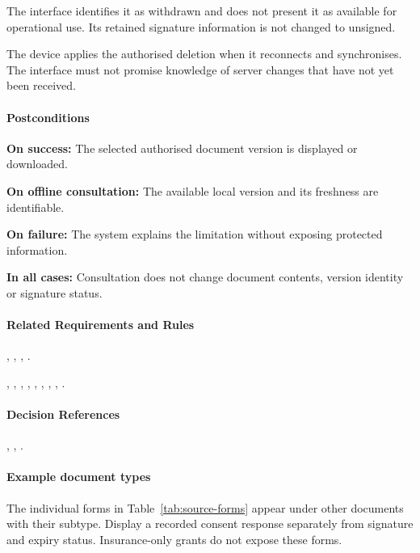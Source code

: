 \begin{description}[style=nextline]
    \item[A10 --- The current source is withdrawn.]
    The interface identifies it as withdrawn
    and does not present it as available
    for operational use.
    Its retained signature information
    is not changed to unsigned.

    \item[A11 --- A deleted version remains on an offline device.]
    The device applies the authorised deletion
    when it reconnects and synchronises.
    The interface must not promise knowledge
    of server changes that have not yet been received.
\end{description}

\paragraph{Postconditions}

\textbf{On success:}
The selected authorised document version
is displayed or downloaded.

\textbf{On offline consultation:}
The available local version and its freshness
are identifiable.

\textbf{On failure:}
The system explains the limitation
without exposing protected information.

\textbf{In all cases:}
Consultation does not change document contents,
version identity or signature status.

\paragraph{Related Requirements and Rules}
\hyperref[fr:038]{}, \hyperref[fr:039]{}, \hyperref[fr:041]{}, \hyperref[fr:044]{}.

\hyperref[br:022]{}, \hyperref[br:023]{}, \hyperref[br:024]{}, \hyperref[br:025]{}, \hyperref[br:026]{}, \hyperref[br:027]{}, \hyperref[br:028]{}, \hyperref[br:029]{}, \hyperref[br:030]{}.

\paragraph{Decision References}
, , .

\paragraph{Example document types}
The individual forms in Table~\ref{tab:source-forms} appear under other documents
with their subtype. Display a recorded consent response separately from signature
and expiry status. Insurance-only grants do not expose these forms.
